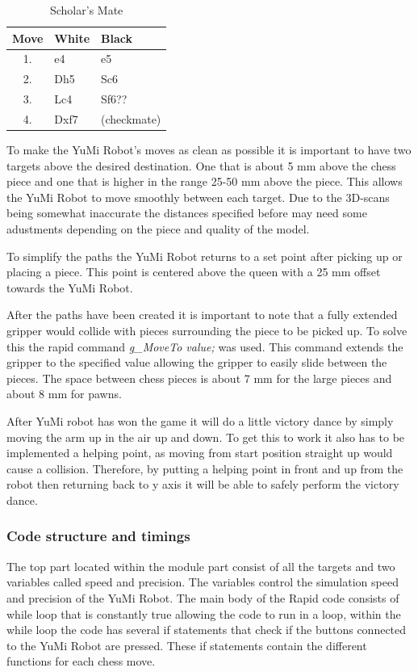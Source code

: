 \documentclass[a4paper,12pt]{article}
\begin{document}
\begin{table}[h] %
    \centering
    \begin{tabular}{c l l}
        \hline
        Move & White & Black \\
        \hline
        1. & e4 & e5 \\
        2. & Dh5 & Sc6 \\
        3. & Lc4 & Sf6?? \\
        4. & Dxf7 & (checkmate) \\
        \hline
    \end{tabular}
    \caption{Scholar's Mate}
    \label{tab:chess_moves}
\end{table}
To make the YuMi Robot's moves as clean as possible it is important to have two targets above the desired destination. One that is about 5 mm above the chess piece and one that is higher in the range 25-50 mm above the piece. This allows the YuMi Robot to move smoothly between each target. Due to the 3D-scans being somewhat inaccurate the distances specified before may need some adustments depending on the piece and quality of the model.

To simplify the paths the YuMi Robot returns to a set point after picking up or placing a piece. This point is centered above the queen with a 25 mm offset towards the YuMi Robot. 

After the paths have been created it is important to note that a fully extended gripper would collide with pieces surrounding the piece to be picked up. To solve this the rapid command \textit{g\_MoveTo value;} was used. This command extends the gripper to the specified value allowing the gripper to easily slide between the pieces. The space between chess pieces is about 7 mm for the large pieces and about 8 mm for pawns.

After YuMi robot has won the game it will do a little victory dance by simply moving the arm up in the air up and down. To get this to work it also has to be implemented a helping point, as moving from start position straight up would cause a collision. Therefore, by putting a helping point in front and up from the robot then returning back to y axis it will be able to safely perform the victory dance. 

\subsubsection{Code structure and timings}
The top part located within the module part consist of all the targets and two variables called speed and precision. The variables control the simulation speed and precision of the YuMi Robot. The main body of the Rapid code consists of while loop that is constantly true allowing the code to run in a loop, within the while loop the code has several if statements that check if the buttons connected to the YuMi Robot are pressed. These if statements contain the different functions for each chess move.
\end{document}
